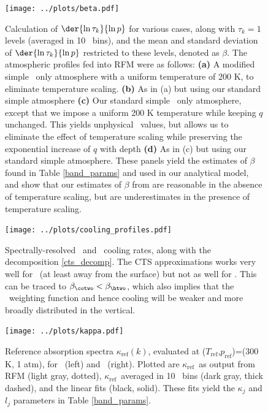 \documentclass[10pt]{article}
\newcommand{\tauk}{\ensuremath{\tau_k}}
\newcommand{\kapparef}{\ensuremath{\kappa_{\mathrm{ref}}}}
\newcommand{\Tref}{\ensuremath{T_{\mathrm{ref}}}}
\newcommand{\pref}{\ensuremath{p_{\mathrm{ref}}}}
\begin{document}
\begin{figure}[h!]
	\begin{center}
			\texttt{[image: ../plots/beta.pdf]}
		\caption{Calculation of $\der{\ln \tauk}{\ln p}$ for various cases, along with $\tauk=1$ levels (averaged in 10 \cminverse\ bins), and the mean and standard deviation of $\der{\ln \tauk}{\ln p}$ restricted to these levels, denoted as $\beta$. The atmospheric profiles fed into RFM were as follows:
					\textbf{(a)}  A modified simple \cotwo\ only atmosphere  with a uniform temperature of 200 K, to eliminate temperature scaling.
					\textbf{(b)}  As in (a) but using our standard simple atmosphere
					\textbf{(c)}  Our  standard simple \htwo\ only atmosphere, except that we impose a uniform 200 K temperature while keeping $q$ unchanged. This yields unphysical \RH\ values, but allows us to eliminate the effect of temperature scaling while preserving the exponential increase of $q$ with depth  
					\textbf{(d)}   As in (c) but using our standard simple atmosphere.
					These panels yield the estimates of $\beta$ found in Table \ref{band_params} and used in our analytical model, and show that our estimates of $\beta$ from  are reasonable in the absence of temperature scaling, but are underestimates in the presence of temperature scaling.
		\label{beta}
		}
	\end{center}
\end{figure}

\begin{figure}[h]
	\begin{center}
			\texttt{[image: ../plots/cooling\_profiles.pdf]}
		\caption{Spectrally-resolved \htwo\  and \cotwo\ cooling rates, along with the decomposition \eqref{cts_decomp}. The CTS approximations works very well for \htwo\ (at least away from the surface) but not as well for \cotwo. This can be traced to $\beta_{\cotwo} < \beta_{\htwo}$, which also implies that the \cotwo\ weighting function and hence cooling will be weaker and more broadly distributed in the vertical.
		\label{cooling_profiles}
		}
	\end{center}
\end{figure}

\begin{figure}[h!]
	\begin{center}
			\texttt{[image: ../plots/kappa.pdf]}
		\caption{Reference absorption spectra $\kapparef(k)$, evaluated at (\Tref,\pref)=(300 K, 1 atm), for \htwo\ (left) and \cotwo\ (right). Plotted are \kapparef\ as output from RFM (light gray, dotted), \kapparef\ averaged in 10 \cminverse\ bins (dark gray, thick dashed), and the linear fits  (black, solid). These fits yield the $\kappa_j$ and $l_j$ parameters in Table \ref{band_params}.
		\label{kappa}
		}
	\end{center}
\end{figure}
\end{document}
